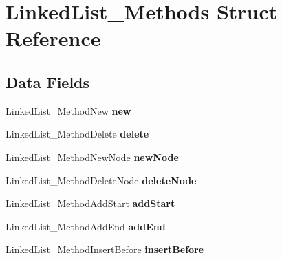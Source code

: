 \hypertarget{structLinkedList__Methods}{\section{Linked\-List\-\_\-\-Methods Struct Reference}
\label{structLinkedList__Methods}
}
\subsection*{Data Fields}
\begin{DoxyCompactItemize}
\item 
\hypertarget{structLinkedList__Methods_ad84aeda6ca17fdffc75c1307bde4254c}{Linked\-List\-\_\-\-Method\-New {\bfseries new}}\label{structLinkedList__Methods_ad84aeda6ca17fdffc75c1307bde4254c}

\item 
\hypertarget{structLinkedList__Methods_a4357665d54e158654b7415e7ac408f56}{Linked\-List\-\_\-\-Method\-Delete {\bfseries delete}}\label{structLinkedList__Methods_a4357665d54e158654b7415e7ac408f56}

\item 
\hypertarget{structLinkedList__Methods_ad0554b1c991f53a2938c1ef088ebf9f8}{Linked\-List\-\_\-\-Method\-New\-Node {\bfseries new\-Node}}\label{structLinkedList__Methods_ad0554b1c991f53a2938c1ef088ebf9f8}

\item 
\hypertarget{structLinkedList__Methods_a5c264151691e3e4a7c7e562d5987d004}{Linked\-List\-\_\-\-Method\-Delete\-Node {\bfseries delete\-Node}}\label{structLinkedList__Methods_a5c264151691e3e4a7c7e562d5987d004}

\item 
\hypertarget{structLinkedList__Methods_a92a13b5475403e322fd73b9c07d84cdd}{Linked\-List\-\_\-\-Method\-Add\-Start {\bfseries add\-Start}}\label{structLinkedList__Methods_a92a13b5475403e322fd73b9c07d84cdd}

\item 
\hypertarget{structLinkedList__Methods_ac1dd7f9f7df59fb851c989da15183c5f}{Linked\-List\-\_\-\-Method\-Add\-End {\bfseries add\-End}}\label{structLinkedList__Methods_ac1dd7f9f7df59fb851c989da15183c5f}

\item 
\hypertarget{structLinkedList__Methods_a49f9aeef7c3b6a180fd6c73c8c8342b6}{Linked\-List\-\_\-\-Method\-Insert\-Before {\bfseries insert\-Before}}\label{structLinkedList__Methods_a49f9aeef7c3b6a180fd6c73c8c8342b6}


\end{DoxyCompactItemize}
